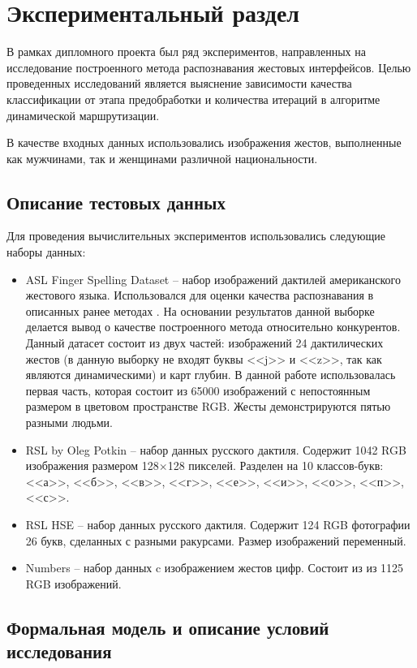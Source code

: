 \chapter{Экспериментальный раздел}
\label{cha:research}

В рамках дипломного проекта был ряд экспериментов, направленных на исследование построенного метода распознавания жестовых интерфейсов. Целью проведенных исследований является выяснение зависимости качества классификации от этапа предобработки и количества итераций в алгоритме динамической маршрутизации.

В качестве входных данных использовались изображения жестов, выполненные как мужчинами, так и женщинами различной национальности.

\section{Описание тестовых данных}

Для проведения вычислительных экспериментов использовались следующие наборы данных:

\begin{itemize}
	\item ASL Finger Spelling Dataset -- набор изображений дактилей американского жестового языка. Использовался для оценки качества распознавания в описанных ранее методах \cite{Karn,Starner,Garcia}. На основании результатов данной выборке делается вывод о качестве построенного метода относительно конкурентов. Данный датасет состоит из двух частей: изображений 24 дактилических жестов (в данную выборку не входят буквы <<j>> и <<z>>, так как являются динамическими) и карт глубин. В данной работе использовалась первая часть, которая состоит из 65000 изображений с непостоянным размером в цветовом пространстве RGB. Жесты демонстрируются пятью разными людьми.
	\item RSL by Oleg Potkin -- набор данных русского дактиля. Содержит 1042 RGB изображения размером 128$\times$128 пикселей. Разделен на 10 классов-букв: <<а>>, <<б>>, <<в>>, <<г>>, <<е>>, <<и>>, <<о>>, <<п>>, <<с>>.
	\item RSL HSE -- набор данных русского дактиля. Содержит 124 RGB фотографии 26 букв, сделанных с разными ракурсами. Размер изображений переменный.
	\item Numbers -- набор данных c изображением жестов цифр. Состоит из из 1125 RGB изображений.
\end{itemize}

\section{Формальная модель и описание условий исследования}

